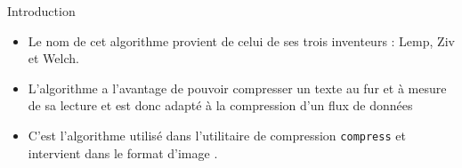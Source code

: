 \documentclass[10pt]{beamer}
\begin{document}
\begin{frame}{\Ctitle}{\stitle}
	\begin{block}{Introduction}
		\begin{itemize}
			\item<1-> Le nom de cet algorithme provient de celui de ses trois inventeurs : Lemp, Ziv et Welch.
			\item<2-> L'algorithme a l'avantage de pouvoir compresser un texte au fur et à mesure de sa lecture et  est donc adapté à la compression d'un flux de données
			\item<3-> C'est l'algorithme utilisé dans l'utilitaire de compression {\tt compress} et intervient dans le format d'image .
		\end{itemize}
	\end{block}
\end{frame}
\end{document}
